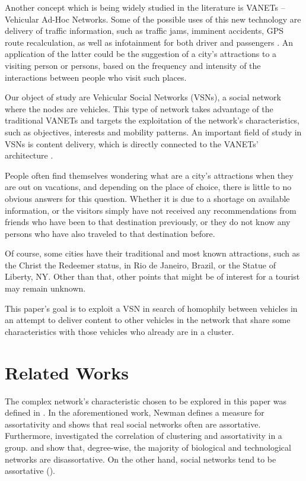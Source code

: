 \documentclass[12pt]{article}
\begin{document}
Another concept which is being widely studied in the literature is VANETs -- Vehicular Ad-Hoc Networks. Some of the possible uses of this new technology are delivery of traffic information, such as traffic jams, imminent accidents, GPS route recalculation, as well as infotainment for both driver and passengers \cite{abdalla-vanets}. An application of the latter could be the suggestion of a city's attractions to a visiting person or persons, based on the frequency and intensity of the interactions between people who visit such places.

Our object of study are Vehicular Social Networks (VSNs), a social network where the nodes are vehicles. This type of network takes advantage of the traditional VANETs and targets the exploitation of the network's characteristics, such as objectives, interests and mobility patterns. An important field of study in VSNs is content delivery, which is directly connected to the VANETs' architecture \cite{RAHIM201896}.

People often find themselves wondering what are a city's attractions when they are out on vacations, and depending on the place of choice, there is little to no obvious answers for this question. Whether it is due to a shortage on available information, or the visitors simply have not received any recommendations from friends who have been to that destination previously, or they do not know any persons who have also traveled to that destination before.

Of course, some cities have their traditional and most known attractions, such as the Christ the Redeemer status, in Rio de Janeiro, Brazil, or the Statue of Liberty, NY. Other than that, other points that might be of interest for a tourist may remain unknown.

This paper's goal is to exploit a VSN in search of homophily between vehicles in an attempt to deliver content to other vehicles in the network that share some characteristics with those vehicles who already are in a cluster.

\section{Related Works}

The complex network's characteristic chosen to be explored in this paper was defined in \cite{Newman-assort-2003}. In the aforementioned work, Newman defines a measure for assortativity and shows that real social networks often are assortative. Furthermore, \cite{newman_and_park} investigated the correlation of clustering and assortativity in a group. \cite{Newman-assort-2003} and \cite{CATANZARO2004119} show that, degree-wise, the majority of biological and technological networks are disassortative. On the other hand, social networks tend to be assortative (\cite{BUCCAFURRI201556}).
\end{document}
